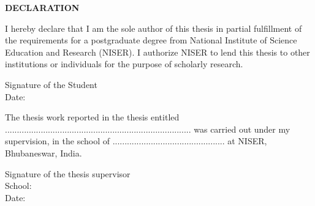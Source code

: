 \begin{center}
{\bf DECLARATION}
\end{center}

I hereby declare that I am the sole author of this thesis in partial fulfillment of the requirements for a postgraduate degree from National Institute of Science Education and Research (NISER). I authorize NISER to lend this thesis to other institutions or individuals for the purpose of scholarly research.

\vskip1.0in

\hspace*{3.5in} {Signature of the Student} \\
\hspace*{3.5in} {Date:}

\vskip1.0in
\vskip1.0in

The thesis work reported in the thesis entitled ..............................................................................  was carried out under my supervision, in the school of ............................................... at NISER, Bhubaneswar, India.

\vskip1.0in

\hspace*{3.5in} {Signature of the thesis supervisor} \\
\hspace*{3.5in} {School:}\\
\hspace*{3.5in} {Date:}